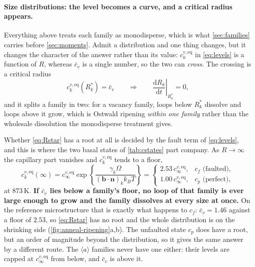 \documentclass{article}
\newcommand{\aloop}{\ensuremath{\langle a\rangle}}
\newcommand{\bvec}{\bm b}
\newcommand{\nvec}{\bm n}
\begin{document}
\paragraph{Size distributions: the level becomes a curve, and a critical radius
appears.} Everything above treats each family as monodisperse, which is what
\cref{sec:families} carries before \cref{sec:moments}. Admit a distribution and
one thing changes, but it changes the character of the answer rather than its
value: $c^{v,\mathrm{eq}}_k$ in \cref{eq:levels} is a function of $R$, whereas
$\bar c_v$ is a single number, so the two can \emph{cross}. The crossing is a
critical radius
\begin{equation}
  c^{v,\mathrm{eq}}_{k}(R^\ast_k)=\bar c_v
  \qquad\Longrightarrow\qquad
  \left.\frac{\mathrm dR_k}{\mathrm dt}\right|_{R^\ast_k}=0,
  \label{eq:Rstar}
\end{equation}
and it splits a family in two: for a vacancy family, loops below $R^\ast_k$
dissolve and loops above it grow, which is Ostwald ripening \emph{within one
family} rather than the wholesale dissolution the monodisperse treatment gives.

Whether \cref{eq:Rstar} has a root at all is decided by the fault term of
\cref{eq:levels}, and this is where the two basal states of \cref{tab:cstates}
part company. As $R\to\infty$ the capillary part vanishes and
$c^{v,\mathrm{eq}}_k$ tends to a floor,
\begin{equation}
  c^{v,\mathrm{eq}}_{k}(\infty)
  =c^{v,\mathrm{eq}}_\infty
   \exp\!\left\{\frac{\gamma_k\Omega}{(\bvec\!\cdot\!\nvec)_kk_BT}\right\}
  =\begin{cases}
     2.53\,c^{v,\mathrm{eq}}_\infty, & c_f \text{ (faulted)},\\[2pt]
     1.00\,c^{v,\mathrm{eq}}_\infty, & c_p \text{ (perfect)},
   \end{cases}
  \label{eq:levelfloor}
\end{equation}
at $873\,$K. \textbf{If $\bar c_v$ lies below a family's floor, no loop of that
family is ever large enough to grow and the family dissolves at every size at
once.} On the reference microstructure that is exactly what happens to $c_f$:
$\bar c_v=1.46$ against a floor of $2.53$, so \cref{eq:Rstar} has no root and the
whole distribution is on the shrinking side (\cref{fig:anneal-ripening}a,b). The
unfaulted state $c_p$ does have a root, but an order of magnitude beyond the
distribution, so it gives the same answer by a different route. The \aloop{}
families never have one either: their levels are capped at
$c^{v,\mathrm{eq}}_\infty$ from below, and $\bar c_v$ is above it.
\end{document}
